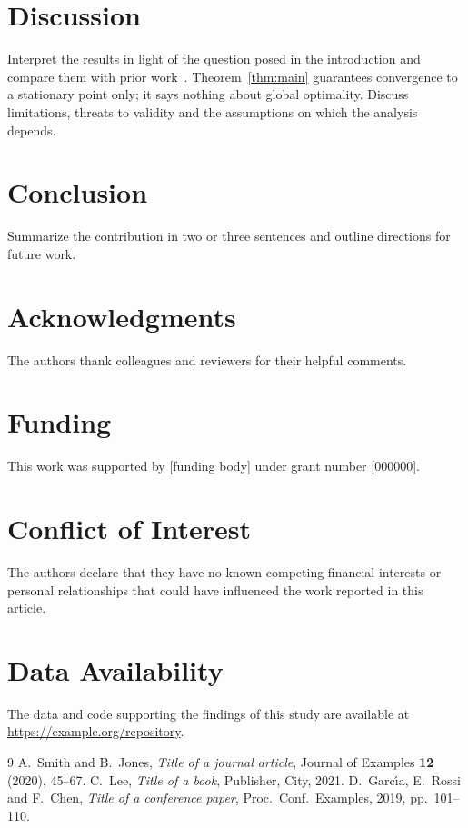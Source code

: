 \section{Discussion}\label{sec:discussion}
Interpret the results in light of the question posed in the introduction and
compare them with prior work~\cite{garcia2019}. Theorem~\ref{thm:main} guarantees
convergence to a stationary point only; it says nothing about global optimality.
Discuss limitations, threats to validity and the assumptions on which the
analysis depends.

\section{Conclusion}\label{sec:conclusion}
Summarize the contribution in two or three sentences and outline directions for
future work.

\section*{Acknowledgments}
The authors thank colleagues and reviewers for their helpful comments.

\section*{Funding}
This work was supported by [funding body] under grant number [000000].

\section*{Conflict of Interest}
The authors declare that they have no known competing financial interests or
personal relationships that could have influenced the work reported in this
article.

\section*{Data Availability}
The data and code supporting the findings of this study are available at
\url{https://example.org/repository}.

\begingroup\small
\begin{thebibliography}{9}
\setlength{\itemsep}{2pt}
 A.~Smith and B.~Jones, \emph{Title of a journal article},
  Journal of Examples \textbf{12} (2020), 45--67.
 C.~Lee, \emph{Title of a book}, Publisher, City, 2021.
 D.~Garc\'{\i}a, E.~Rossi and F.~Chen, \emph{Title of a
  conference paper}, Proc.\ Conf.\ Examples, 2019, pp.~101--110.
\end{thebibliography}
\endgroup


